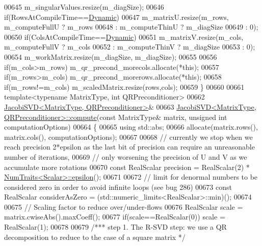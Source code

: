 \begin{DoxyCode}
00645   m\_singularValues.resize(m\_diagSize);
00646   \textcolor{keywordflow}{if}(RowsAtCompileTime==\hyperlink{namespace_eigen_ad81fa7195215a0ce30017dfac309f0b2}{Dynamic})
00647     m\_matrixU.resize(m\_rows, m\_computeFullU ? m\_rows
00648                             : m\_computeThinU ? m\_diagSize
00649                             : 0);
00650   \textcolor{keywordflow}{if}(ColsAtCompileTime==\hyperlink{namespace_eigen_ad81fa7195215a0ce30017dfac309f0b2}{Dynamic})
00651     m\_matrixV.resize(m\_cols, m\_computeFullV ? m\_cols
00652                             : m\_computeThinV ? m\_diagSize
00653                             : 0);
00654   m\_workMatrix.resize(m\_diagSize, m\_diagSize);
00655   
00656   \textcolor{keywordflow}{if}(m\_cols>m\_rows)   m\_qr\_precond\_morecols.allocate(*\textcolor{keyword}{this});
00657   \textcolor{keywordflow}{if}(m\_rows>m\_cols)   m\_qr\_precond\_morerows.allocate(*\textcolor{keyword}{this});
00658   \textcolor{keywordflow}{if}(m\_rows!=m\_cols)  m\_scaledMatrix.resize(rows,cols);
00659 \}
00660 
00661 \textcolor{keyword}{template}<\textcolor{keyword}{typename} MatrixType, \textcolor{keywordtype}{int} QRPreconditioner>
00662 \hyperlink{group___s_v_d___module_class_eigen_1_1_jacobi_s_v_d}{JacobiSVD<MatrixType, QRPreconditioner>}&
00663 \hyperlink{group___s_v_d___module_a5dab376cc86cf0d36674bcdad4af3f5a}{JacobiSVD<MatrixType, QRPreconditioner>::compute}(\textcolor{keyword}{const} 
      MatrixType& matrix, \textcolor{keywordtype}{unsigned} \textcolor{keywordtype}{int} computationOptions)
00664 \{
00665   \textcolor{keyword}{using} std::abs;
00666   allocate(matrix.rows(), matrix.cols(), computationOptions);
00667 
00668   \textcolor{comment}{// currently we stop when we reach precision 2*epsilon as the last bit of precision can require an
       unreasonable number of iterations,}
00669   \textcolor{comment}{// only worsening the precision of U and V as we accumulate more rotations}
00670   \textcolor{keyword}{const} RealScalar precision = RealScalar(2) * \hyperlink{group___core___module_struct_eigen_1_1_num_traits}{NumTraits<Scalar>::epsilon}();
00671 
00672   \textcolor{comment}{// limit for denormal numbers to be considered zero in order to avoid infinite loops (see bug 286)}
00673   \textcolor{keyword}{const} RealScalar considerAsZero = (std::numeric\_limits<RealScalar>::min)();
00674 
00675   \textcolor{comment}{// Scaling factor to reduce over/under-flows}
00676   RealScalar scale = matrix.cwiseAbs().maxCoeff();
00677   \textcolor{keywordflow}{if}(scale==RealScalar(0)) scale = RealScalar(1);
00678   
00679   \textcolor{comment}{/*** step 1. The R-SVD step: we use a QR decomposition to reduce to the case of a square matrix */}

\end{DoxyCode}

